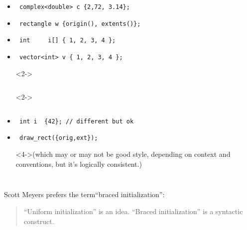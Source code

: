 \begin{frame}[fragile]
\begin{columns}[t]
\begin{itemize}
\item<2->{\scriptsize\begin{verbatim} complex<double> c {2,72, 3.14}; \end{verbatim}}
\item<2->{\scriptsize\begin{verbatim} rectangle w {origin(), extents()};\end{verbatim}}
\item<2->{\scriptsize\begin{verbatim} int     i[] { 1, 2, 3, 4 }; \end{verbatim}}
\item<2->{\scriptsize\begin{verbatim} vector<int> v { 1, 2, 3, 4 };  \end{verbatim}}
\item[] <2->{\scriptsize\begin{verbatim} \end{verbatim}}
\item[] <2->{\scriptsize\begin{verbatim} \end{verbatim}}
\item<3->{\scriptsize\begin{verbatim} int i  {42}; // different but ok\end{verbatim}}
\item<4->{\scriptsize\begin{verbatim} draw_rect({orig,ext});  \end{verbatim}}
\item[]<4->{\scriptsize(which may or may not be good style, depending on context
  and conventions, but it's logically consistent.)}
\end{itemize}
\end{columns}
\vskip 12pt
\pause{}

Scott Meyers prefers the term``braced initialization'':
\begin{quotation}
``Uniform initialization'' is an idea. ``Braced initialization'' is a
  syntactic construct.
\end{quotation}
\end{frame}





